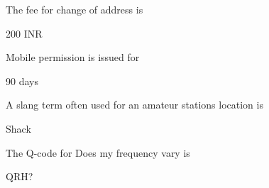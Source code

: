 \documentclass[a4paper]{article}
\begin{document}
\vspace{5mm}



\begin{question}
	The fee for change of address is \spaces
\end{question}
\begin{solution}
	200 INR
\end{solution}

\vspace{5mm}



\begin{question}
	Mobile permission is issued for \spaces
\end{question}
\begin{solution}
	90 days
\end{solution}

\vspace{5mm}



\begin{question}
	A slang term often used for an amateur station\apostrophe{}s location is \spaces
\end{question}
\begin{solution}
	Shack
\end{solution}

\vspace{5mm}



\begin{question}
	The Q-code for \apostrophe{}Does my frequency vary\apostrophe{} is \spaces
\end{question}
\begin{solution}
	QRH?
\end{solution}
\end{document}

